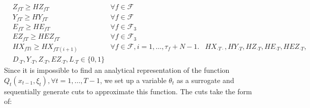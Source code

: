 \documentclass[12pt]{article}
\begin{document}
\begin{subequations}
\begin{align}
		& Z_{fT} \geq HZ_{fT} & \forall f \in \mathcal{F}\\
		& Y_{fT} \geq HY_{fT} & \forall f \in \mathcal{F}\\
		& E_{fT} \geq HE_{fT} & \forall f \in \mathcal{F}_3\\
		& EZ_{fT} \geq HEZ_{fT} & \forall f \in \mathcal{F}_3\\
		& HX_{fTi} \geq HX_{fT(i+1)} & \forall f \in \mathcal{F}, i = 1, \dots, \tau_{f} + N -1.
		& HX_{\cdot T \cdot}, HY_{\cdot T}, HZ_{\cdot T}, HE_{\cdot T}, HEZ_{\cdot T},& \nonumber\\ 
		&D_{\cdot T}, Y_{\cdot T}, Z_{\cdot T}, EZ_{\cdot T}, L_{\cdot T} \in \{0,1\}&
		\end{align}
	\end{subequations}
	Since it is impossible to find an analytical representation of the function \(Q_t(x_{t-1},\xi_t), \forall t = 1, \dots, T-1\), we set up a variable \(\theta_t\)  as a surrogate and sequentially generate cuts to approximate this function. The cuts take the form of:
\end{document}
